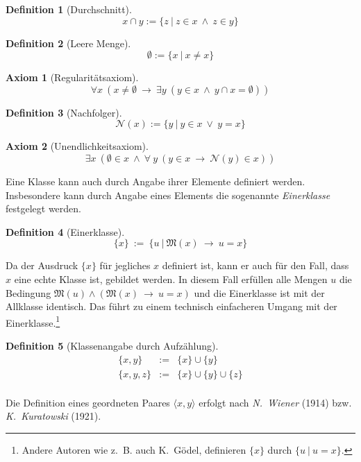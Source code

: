 \documentclass[a4paper,german,10pt,twoside]{book}
\newtheorem{ax}{Axiom}
\newtheorem{defn}{Definition}
\newcommand{\deft}{:=}
\newcommand{\impl}{\ \rightarrow \ }
\newcommand{\conj}{\ \wedge \ }
\newcommand{\disj}{\ \vee \ }
\newcommand{\successor}[1]{\mathcal{N}(#1)}
\newcommand{\isSet}[1]{\mathfrak{M}(#1)}
\begin{document}
{\begin{defn}[Durchschnitt]
$$ x \cap y \deft \{z~|~z \in x \conj z \in y \}$$
\end{defn}

\begin{defn}[Leere Menge]
$$ \emptyset \deft \{x~|~x \neq x \}$$
\end{defn}

\begin{ax}[Regularit{\"a}tsaxiom]
$$\forall x \ (x \neq \emptyset \impl \exists y \ (y \in x \conj y \cap x = \emptyset))$$
\end{ax}

\begin{defn}[Nachfolger]
$$ \successor{x} \deft \{y~|~y \in x \disj y = x \}$$
\end{defn}

\begin{ax}[Unendlichkeitsaxiom]
$$\exists x \ (\emptyset \in x \conj \forall~y \ (y \in x \impl \successor{y} \in x))$$
\end{ax}

Eine Klasse kann auch durch Angabe ihrer Elemente definiert werden. Insbesondere kann durch Angabe
eines Elements die sogenannte \emph{Einerklasse} festgelegt werden.
\begin{defn}[Einerklasse]
$$
\{x\} \ \deft \ \{u~|~\isSet{x} \impl u = x \}
$$
\end{defn}
Da der Ausdruck $\{x\}$ f{\"u}r jegliches $x$ definiert ist, kann er auch f{\"u}r den Fall, dass $x$ eine
echte Klasse ist, gebildet werden. In diesem Fall erf{\"u}llen alle Mengen $u$ die Bedingung $\isSet{u}
\land (\isSet{x} \impl u = x)$ und die Einerklasse ist mit der Allklasse identisch. Das f{\"u}hrt zu
einem technisch einfacheren Umgang mit der Einerklasse.\footnote{Andere Autoren wie z.~B. auch
K.~G{\"o}del, definieren $\{x\}$ durch $\{u~|~u = x\}$.}

\begin{defn}[Klassenangabe durch Aufz{\"a}hlung]
\begin{eqnarray}
\{x, y\} & \deft & \{x\} \cup \{y\} \\
\{x, y, z\} & \deft & \{x\} \cup \{y\} \cup \{z\} \\
\end{eqnarray}
\end{defn}

Die Definition eines geordneten Paares $\langle x, y\rangle$ erfolgt nach \emph{N.~Wiener} (1914)
bzw. \emph{K.~Kuratowski} (1921).

}
\end{document}
